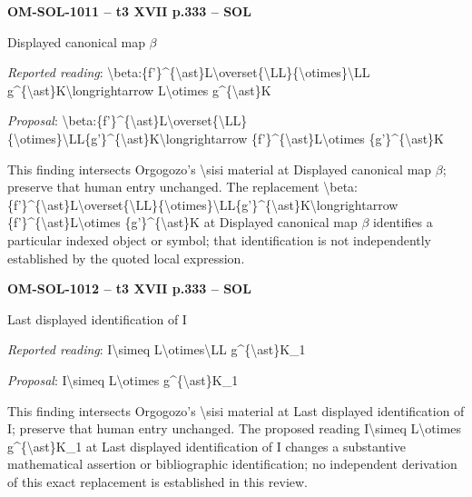 \par\noindent\textbf{OM-SOL-1011 -- t3 XVII p.333 -- SOL}\par
Displayed canonical map \ensuremath{\beta}\par
\emph{Reported reading}: \textbackslash{}beta:\{f'\}\textasciicircum{}\{\textbackslash{}ast\}L\textbackslash{}overset\{\textbackslash{}LL\}\{\textbackslash{}otimes\}\textbackslash{}LL g\textasciicircum{}\{\textbackslash{}ast\}K\textbackslash{}longrightarrow L\textbackslash{}otimes g\textasciicircum{}\{\textbackslash{}ast\}K\par
\emph{Proposal}: \textbackslash{}beta:\{f'\}\textasciicircum{}\{\textbackslash{}ast\}L\textbackslash{}overset\{\textbackslash{}LL\}\{\textbackslash{}otimes\}\textbackslash{}LL\{g'\}\textasciicircum{}\{\textbackslash{}ast\}K\textbackslash{}longrightarrow \{f'\}\textasciicircum{}\{\textbackslash{}ast\}L\textbackslash{}otimes \{g'\}\textasciicircum{}\{\textbackslash{}ast\}K\par
This finding intersects Orgogozo's \textbackslash{}sisi material at Displayed canonical map \ensuremath{\beta}; preserve that human entry unchanged. The replacement \textbackslash{}beta:\{f'\}\textasciicircum{}\{\textbackslash{}ast\}L\textbackslash{}overset\{\textbackslash{}LL\}\{\textbackslash{}otimes\}\textbackslash{}LL\{g'\}\textasciicircum{}\{\textbackslash{}ast\}K\textbackslash{}longrightarrow \{f'\}\textasciicircum{}\{\textbackslash{}ast\}L\textbackslash{}otimes \{g'\}\textasciicircum{}\{\textbackslash{}ast\}K at Displayed canonical map \ensuremath{\beta} identifies a particular indexed object or symbol; that identification is not independently established by the quoted local expression.\par
\par\noindent\textbf{OM-SOL-1012 -- t3 XVII p.333 -- SOL}\par
Last displayed identification of I\par
\emph{Reported reading}: I\textbackslash{}simeq L\textbackslash{}otimes\textbackslash{}LL g\textasciicircum{}\{\textbackslash{}ast\}K\_1\par
\emph{Proposal}: I\textbackslash{}simeq L\textbackslash{}otimes g\textasciicircum{}\{\textbackslash{}ast\}K\_1\par
This finding intersects Orgogozo's \textbackslash{}sisi material at Last displayed identification of I; preserve that human entry unchanged. The proposed reading I\textbackslash{}simeq L\textbackslash{}otimes g\textasciicircum{}\{\textbackslash{}ast\}K\_1 at Last displayed identification of I changes a substantive mathematical assertion or bibliographic identification; no independent derivation of this exact replacement is established in this review.\par

